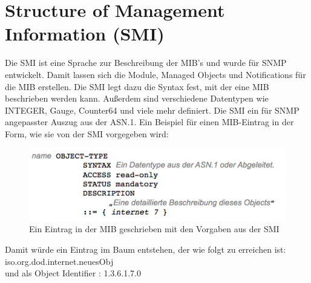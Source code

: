 \documentclass[11pt,a4paper]{article}
\begin{document}
\section{Structure of Management Information (SMI)}
Die SMI ist eine Sprache zur Beschreibung der MIB’s und wurde für SNMP entwickelt. Damit lassen sich die Module, Managed Objects und Notifications für die MIB erstellen. Die SMI legt dazu die Syntax fest, mit der eine MIB beschrieben werden kann. Außerdem sind verschiedene Datentypen wie INTEGER, Gauge, Counter64 und viele mehr definiert. Die SMI ein für SNMP angepasster Auszug aus der ASN.1.
Ein Beispiel für einen MIB-Eintrag in der Form, wie sie von der SMI vorgegeben wird:
\\
\begin{figure}[h]
	\centering
	\includegraphics[scale=1]{Bilder/mibEintragSMI}
	\caption{Ein Eintrag in der MIB geschrieben mit den Vorgaben aus der SMI}
\end{figure}
Damit würde ein Eintrag im Baum entstehen, der  wie folgt zu erreichen ist: iso.org.dod.internet.neuesObj\\
und als Object Identifier : 1.3.6.1.7.0

\end{document}
